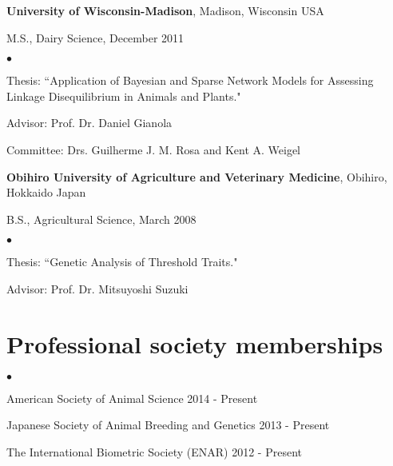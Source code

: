 \documentclass[margin,line,10pt]{res}
\newenvironment{list1}{
  \begin{list}{\ding{113}}{%
      \setlength{\itemsep}{0in}
      \setlength{\parsep}{0in} \setlength{\parskip}{0in}
      \setlength{\topsep}{0in} \setlength{\partopsep}{0in} 
      \setlength{\leftmargin}{0.17in}}}{\end{list}}
\newenvironment{list2}{
  \begin{list}{$\bullet$}{%
      \setlength{\itemsep}{0in}
      \setlength{\parsep}{0in} \setlength{\parskip}{0in}
      \setlength{\topsep}{0in} \setlength{\partopsep}{0in} 
      \setlength{\leftmargin}{0.2in}}}{\end{list}}
\begin{document}
\begin{resume}
{\bf University of Wisconsin-Madison}, Madison, Wisconsin USA\\
\vspace*{-.1in}
\begin{list1}
\item[] M.S., Dairy Science, December 2011
\begin{list2}
\vspace*{.05in}
\item Thesis: ``Application of Bayesian and Sparse Network Models for Assessing Linkage Disequilibrium in Animals and Plants." 
\item Advisor: Prof. Dr. Daniel Gianola 
\item Committee: Drs. Guilherme J. M. Rosa and Kent A. Weigel
\end{list2}
\vspace*{.05in}
\end{list1}


{\bf Obihiro University of Agriculture and Veterinary Medicine}, Obihiro, Hokkaido Japan\\
\vspace*{-.1in}
\begin{list1}
\item[] B.S., Agricultural Science,  March 2008
\begin{list2}
\vspace*{.05in}
\item Thesis:  ``Genetic Analysis of Threshold Traits." 
\item Advisor: Prof. Dr. Mitsuyoshi Suzuki
\end{list2}
\end{list1}









\vspace{0.5cm}
\section{\sc Professional society memberships}
\begin{list2}
\item American Society of Animal Science 2014 - Present
\vspace{0.3cm}
\item Japanese Society of Animal Breeding and Genetics 2013 - Present 
\vspace{0.3cm}
\item The International Biometric Society (ENAR) 2012 - Present
\end{list2}




\end{resume}
\end{document}
